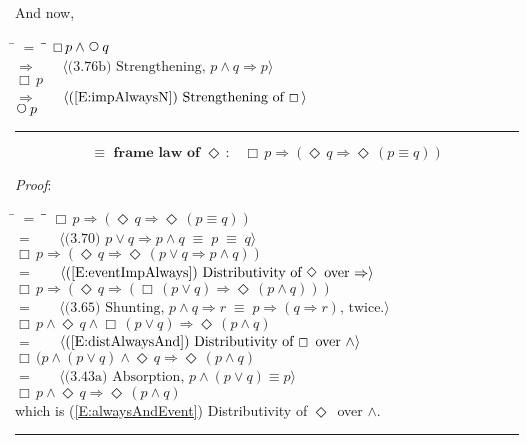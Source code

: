 \documentclass[12pt, fleqn, leqno]{article}
\newcommand{\lgap}{2pt}                             %
\newcommand{\mymathindent}{24pt}                    %
\newcommand{\equivs}{\ensuremath{\;\equiv\;}}       %
\newcommand{\impl}{\ensuremath{\Rightarrow}}        %
\newcommand{\Next}{\;\,\text{\raisebox{3.5pt}{\circle{6}}}}
\newcommand{\Event}{\Diamond\,}
\newcommand{\Always}{\Box\,}
\newcommand{\myqed}{\rule[-.23ex]{1.2ex}{2.0ex}}
\newcommand{\myqedtab}{\hspace{384pt}}              %
\newcommand{\Gll} {\langle}                         %
\newcommand{\Ggg} {\rangle}                         %
\newcommand{\Hint}[1]     {\ \ \ $\Gll              \mbox{#1} \Ggg$ }   %
\begin{document}
And now,
\begin{tabbing}
\hspace{\mymathindent} \= $= \;$ \= \myqedtab \= \kill
  \> \>   $\Always p  \land \Next q $\\[\lgap]
  \> $\impl$  \>  \Hint{(3.76b) Strengthening, $p\land q \impl p$}\\[\lgap]
  \> \>   $\Always p$\\[\lgap]
  \> $\impl$  \>  \Hint{(\ref{E:impAlwaysN}) Strengthening of $\Always$}\\[\lgap]
  \> \>   $\Next p$\quad \myqed
\end{tabbing}

\begin{equation}\label{E:equivframelawEvent}
\textbf{$\equiv$ frame law of $\Event$:}\quad \Always p \impl (\Event q \impl \Event (p \equiv q))
\end{equation}

\emph{Proof}: 
\begin{tabbing}
\hspace{\mymathindent} \= $= \;$ \= \myqedtab \= \kill
  \> \>   $\Always p \impl (\Event q \impl \Event (p \equiv q))$\\[\lgap]
  \> $=$  \>  \Hint{(3.70) $p\lor q \impl p\land q \equivs p \equivs q$}\\[\lgap]
  \> \>   $\Always p \impl (\Event q \impl \Event (p \lor q \impl p \land q))$\\[\lgap]
  \> $=$  \>  \Hint{(\ref{E:eventImpAlways}) Distributivity of $\Event$ over $\impl$}\\[\lgap]
  \> \>   $\Always p \impl (\Event q \impl (\Always (p \lor q) \impl \Event (p \land q)))$\\[\lgap]
   \> $=$  \>  \Hint{(3.65) Shunting, $p\land q\impl r\equivs p\impl (q\impl r)$, twice.}\\[\lgap]
  \> \>   $\Always p \land \Event q  \land \Always (p \lor q) \impl \Event (p \land q) $\\[\lgap]
   \> $=$  \>  \Hint{(\ref{E:distAlwaysAnd}) Distributivity of $\Always$ over $\land$}\\[\lgap]
  \> \>   $\Always (p  \land (p \lor q) \land \Event q  \impl \Event (p \land q)$\\[\lgap]
   \> $=$  \>  \Hint{(3.43a) Absorption, $p \land (p \lor q) \equiv p$}\\[\lgap]
   \> \>   $\Always p  \land \Event q  \impl \Event (p \land q)$\\[\lgap]
   \> which is (\ref{E:alwaysAndEvent}) Distributivity of $\Event$ over $\land$. \quad \myqed
\end{tabbing}
\end{document}
